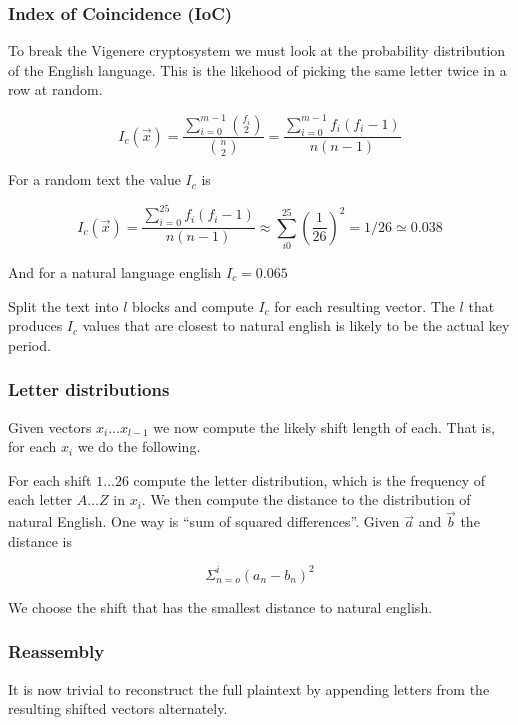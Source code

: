 \subsubsection{Index of Coincidence (IoC)}
To break the Vigenere cryptosystem we must look at the probability
distribution of the English language. This is the likehood of picking
the same letter twice in a row at random.

\[ I_c(\vec{x}) =
\frac{\sum^{m-1}_{i=0}\binom{f_i}{2}}{\binom{n}{2}}=
\frac{\sum^{m-1}_{i=0}f_i(f_i - 1)}{n(n-1)}\]

For a random text the value $I_c$ is

\[ I_c(\vec{x}) =
\frac{\sum^{25}_{i=0}f_i(f_i - 1)}{n(n-1)} \approx
\sum^{25}_{i0}(\frac{1}{26})^2= 1/26 \simeq 0.038\]

And for a natural language english $I_c = 0.065$

Split the text into $l$ blocks and compute $I_c$ for each resulting
vector. The $l$ that produces $I_c$ values that are closest to natural
english is likely to be the actual key period.

\subsubsection{Letter distributions}
Given vectors $x_i \ldots x_{l-1}$ we now compute the likely shift
length of each. That is, for each $x_i$ we do the following.

For each shift $1 \ldots 26$ compute the letter distribution, which is
the frequency of each letter $A \ldots Z$ in $x_i$. We then compute
the distance to the distribution of natural English. One way is ``sum
of squared differences''. Given $\overrightarrow{a}$ and
$\overrightarrow{b}$ the distance is

\[\Sigma_{n=o}^i (a_n - b_n)^2 \]

We choose the shift that has the smallest distance to natural english.

\subsubsection{Reassembly}
It is now trivial to reconstruct the full plaintext by appending
letters from the resulting shifted vectors alternately.